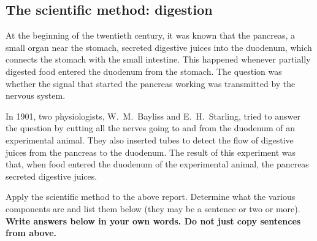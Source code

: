 \documentclass[12pt]{exam}
\begin{document}
\subsection*{The scientific method: digestion}

At the beginning of the twentieth century, it was known that the
pancreas, a small organ near the stomach, secreted digestive juices into
the duodenum, which connects the stomach with the small intestine. This
happened whenever partially digested food entered the duodenum from the
stomach. The question was whether the signal that started the pancreas
working was transmitted by the nervous system. 

In 1901, two physiologists, W.~M.~Bayliss and E.~H.~Starling, tried to 
answer the question by cutting all the nerves going to and from the 
duodenum of an experimental animal. They also inserted tubes to detect the 
flow of digestive juices from the pancreas to the duodenum. The result of this
experiment was that, when food entered the duodenum
of the experimental animal, the pancreas secreted digestive juices.\vspace*{\baselineskip}

Apply the scientific method to the above report. Determine what the various
components are and list them below (they may be a sentence or two or
more). \textbf{Write answers below in your own words. Do not just copy
sentences from above.}
\end{document}
